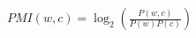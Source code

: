\documentclass[preview]{standalone}
\begin{document}
\begin{align*}
PMI(w,c) = \log_2 \left( \frac{P(w,c)}{P(w)P(c)} \right)
\end{align*}
\end{document}
